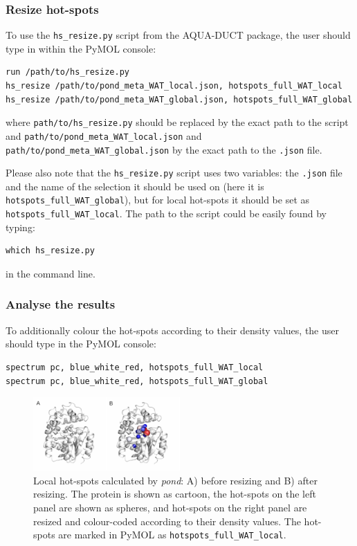 \documentclass[9pt,tutorial, pubversion]{livecoms}
\begin{document}
\subsubsection{Resize hot-spots}
To use the \texttt{hs\_resize.py} script from the AQUA-DUCT package, the user should type in within the PyMOL console:
\begin{lstlisting}[columns=fullflexible]
run /path/to/hs_resize.py
hs_resize /path/to/pond_meta_WAT_local.json, hotspots_full_WAT_local
hs_resize /path/to/pond_meta_WAT_global.json, hotspots_full_WAT_global
\end{lstlisting}
where \texttt{path/to/hs\_resize.py} should be replaced by the exact path to the script and \texttt{path/to/pond\_meta\_WAT\_local.json} and \texttt{path/to/pond\_meta\_WAT\_global.json} by the exact path to the \texttt{.json} file. 

Please also note that the \texttt{hs\_resize.py} script uses two variables: the \texttt{.json} file and the name of the selection it should be used on (here it is \texttt{hotspots\_full\_WAT\_global}), but for local hot-spots it should be set as \texttt{hotspots\_full\_WAT\_local}.
The path to the script could be easily found by typing:
\begin{lstlisting}
which hs_resize.py
\end{lstlisting}
in the command line.

\subsubsection{Analyse the results}
To additionally colour the hot-spots according to their density values, the user should type in the PyMOL console:
\begin{lstlisting}[columns=fullflexible]
spectrum pc, blue_white_red, hotspots_full_WAT_local
spectrum pc, blue_white_red, hotspots_full_WAT_global
\end{lstlisting}

\begin{figure}[ht!]
\centering
\includegraphics[width=0.5\textwidth]{Tut4.3.png}
\caption{Local hot-spots calculated by \textit{pond}: A) before resizing and B) after resizing. The protein is shown as cartoon, the hot-spots on the left panel are shown as spheres, and hot-spots on the right panel are resized and colour-coded according to their density values. The hot-spots are marked in PyMOL as \texttt{hotspots\_full\_WAT\_local}.}
\label{Tut4.3}
\end{figure}
\end{document}
